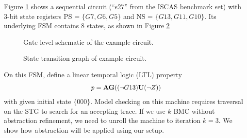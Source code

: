 \begin{Example}
Figure \ref{fig:s27} shows a sequential circuit (``s27'' from the
ISCAS benchmark set) with 3-bit state registers
PS = $\{G7,G6,G5\}$ and NS = $\{G13,G11,G10\}$. 
Its underlying FSM contains 8 states, as shown in Figure \ref{fig:s27_stg}

\begin{figure}[tbp]
\caption{Gate-level schematic of the example circuit.}
\label{fig:s27}
\end{figure}

\begin{figure}[tbp]
\caption{State transition graph of example circuit.}
\label{fig:s27_stg}
\end{figure}

On this FSM, define a linear temporal logic (LTL) property 
$$p = {\bf AG}( (\neg G13) {\bf U} (\neg Z) )$$ 
with given initial state $\{000\}$. Model checking on this machine requires
traversal on the STG to search for an accepting trace. If we use $k$-BMC
without abstraction refinement, we need to unroll the machine to
iteration  $k=3$. We show how abstraction will be applied using our
setup.


\end{Example}
